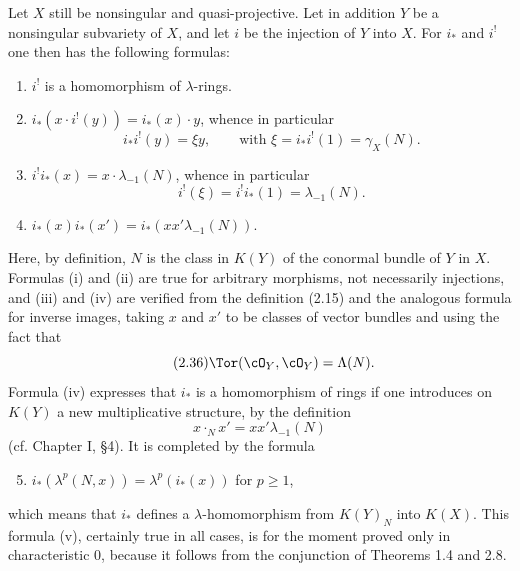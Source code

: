 Let $X$ still be nonsingular and quasi-projective. Let in addition $Y$ be a nonsingular subvariety of $X$, and let $i$ be the injection of $Y$ into $X$. For $i_*$ and $i^!$ one then has the following formulas:
\begin{enumerate}[label=(\roman*)]
\item $i^!$ is a homomorphism of $\lambda$-rings.
\item $i_*(x\cdot i^!(y))=i_*(x)\cdot y$, whence in particular
\[
 i_*i^!(y)=\xi y,
\qquad \text{with }\xi=i_*i^!(1)=\gamma_X(N).
\]
\item $i^!i_*(x)=x\cdot\lambda_{-1}(N)$, whence in particular
\[
 i^!(\xi)=i^!i_*(1)=\lambda_{-1}(N).
\]
\item $i_*(x)i_*(x')=i_*(xx'\lambda_{-1}(N))$.
\end{enumerate}
Here, by definition, $N$ is the class in $K(Y)$ of the conormal bundle of $Y$ in $X$. Formulas (i) and (ii) are true for arbitrary morphisms, not necessarily injections, and (iii) and (iv) are verified from the definition (2.15) and the analogous formula for inverse images, taking $x$ and $x'$ to be classes of vector bundles and using the fact that
\begin{equation}\tag{2.36}
 \Tor(\cO_Y,\cO_Y)=\Lambda(N).
\end{equation}
Formula (iv) expresses that $i_*$ is a homomorphism of rings if one introduces on $K(Y)$ a new multiplicative structure, by the definition
\[
 x\cdot_N x'=xx'\lambda_{-1}(N)
\]
(cf. Chapter I, \S 4). It is completed by the formula
\begin{enumerate}[label=(\roman*)]
\setcounter{enumi}{4}
\item $i_*(\lambda^p(N,x))=\lambda^p(i_*(x))$ for $p\geq 1$,
\end{enumerate}
which means that $i_*$ defines a $\lambda$-homomorphism from $K(Y)_N$ into $K(X)$. This formula (v), certainly true in all cases, is for the moment proved only in characteristic $0$, because it follows from the conjunction of Theorems 1.4 and 2.8.

